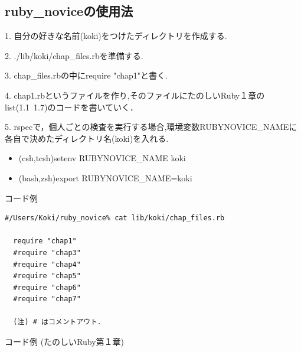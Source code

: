 \subsection{ruby\_noviceの使用法}

1. 自分の好きな名前(koki)をつけたディレクトリを作成する.

2. ./lib/koki/chap\_files.rbを準備する.

3. chap\_files.rbの中にrequire "chap1"と書く.

4. chap1.rbというファイルを作り,そのファイルにたのしいRuby１章のlist(1.1~1.7)のコードを書いていく．

5. rspecで，個人ごとの検査を実行する場合,環境変数RUBYNOVICE\_NAMEに各自で決めたディレクトリ名(koki)を入れる.

\begin{itemize}
\item (csh,tcsh)setenv RUBYNOVICE\_NAME koki
\item (bash,zsh)export RUBYNOVICE\_NAME=koki
\end{itemize}

コード例
\begin{lstlisting}[style=customRuby,basicstyle={\scriptsize\ttfamily}]
  #/Users/Koki/ruby_novice% cat lib/koki/chap_files.rb
  
  require "chap1"
  #require "chap3" 
  #require "chap4"
  #require "chap5"
  #require "chap6"
  #require "chap7"

  (注) # はコメントアウト．
\end{lstlisting}

コード例 (たのしいRuby第１章)

